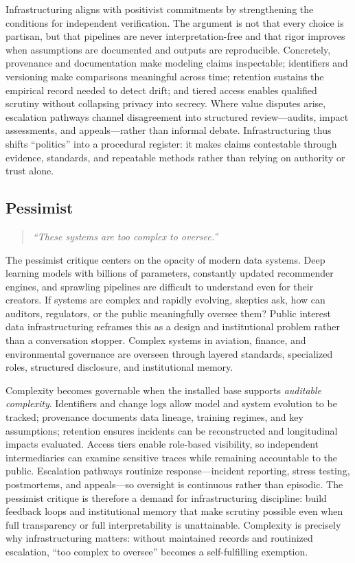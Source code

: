 \documentclass[acmsmall,screen]{acmart}
\begin{document}
Infrastructuring aligns with positivist commitments by strengthening the conditions for independent verification. The argument is not that every choice is partisan, but that pipelines are never interpretation-free and that rigor improves when assumptions are documented and outputs are reproducible. Concretely, provenance and documentation make modeling claims inspectable; identifiers and versioning make comparisons meaningful across time; retention sustains the empirical record needed to detect drift; and tiered access enables qualified scrutiny without collapsing privacy into secrecy. Where value disputes arise, escalation pathways channel disagreement into structured review---audits, impact assessments, and appeals---rather than informal debate. Infrastructuring thus shifts ``politics'' into a procedural register: it makes claims contestable through evidence, standards, and repeatable methods rather than relying on authority or trust alone.

\subsection*{Pessimist}
\begin{quote}\centering
\textit{``These systems are too complex to oversee.''}
\end{quote}

\noindent The pessimist critique centers on the opacity of modern data systems. Deep learning models with billions of parameters, constantly updated recommender engines, and sprawling pipelines are difficult to understand even for their creators. If systems are complex and rapidly evolving, skeptics ask, how can auditors, regulators, or the public meaningfully oversee them? Public interest data infrastructuring reframes this as a design and institutional problem rather than a conversation stopper. Complex systems in aviation, finance, and environmental governance are overseen through layered standards, specialized roles, structured disclosure, and institutional memory.

Complexity becomes governable when the installed base supports \emph{auditable complexity}. Identifiers and change logs allow model and system evolution to be tracked; provenance documents data lineage, training regimes, and key assumptions; retention ensures incidents can be reconstructed and longitudinal impacts evaluated. Access tiers enable role-based visibility, so independent intermediaries can examine sensitive traces while remaining accountable to the public. Escalation pathways routinize response---incident reporting, stress testing, postmortems, and appeals---so oversight is continuous rather than episodic. The pessimist critique is therefore a demand for infrastructuring discipline: build feedback loops and institutional memory that make scrutiny possible even when full transparency or full interpretability is unattainable. Complexity is precisely why infrastructuring matters: without maintained records and routinized escalation, ``too complex to oversee'' becomes a self-fulfilling exemption.
\end{document}
